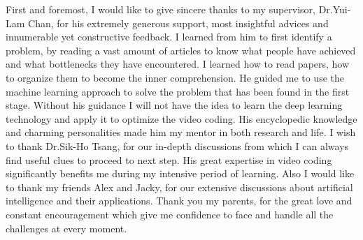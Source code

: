 \documentclass{report}
\begin{document}
    First and foremost, I would like to give sincere thanks to my supervisor,
    Dr.Yui-Lam Chan, for his
    extremely generous support, most insightful advices and innumerable yet
    constructive feedback.
    I learned from him to first identify a problem,
    by reading a vast amount of articles
    to know what people have achieved and what bottlenecks they have encountered.
    I learned how to read papers, how to organize them to
    become the inner comprehension.
    He guided me to use the machine learning approach to solve the
    problem that has been found in the first stage.
    Without his guidance I will not have the idea to learn the deep
    learning technology and apply it to optimize the video coding.
    His encyclopedic knowledge and charming personalities made him my mentor in
    both research and life.
    I wish to thank Dr.Sik-Ho Tsang, for our in-depth discussions from
    which I can always find useful clues to proceed to next step.
    His great expertise in video coding significantly benefits me during my
    intensive period of learning.
    Also I would like to thank my friends Alex
    and Jacky, for our
    extensive discussions about artificial intelligence
    and their applications.
    Thank you my parents, for the great love and constant
    encouragement which give me confidence to face and handle all the
    challenges at every moment.
    \afterpreface
    
    
    
    
    
    
    \printbibliography[heading=bibintoc]
\end{document}
